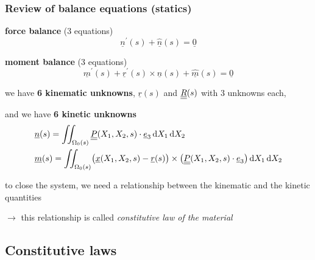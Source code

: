 \begin{frame}
  \frametitle{Review of balance equations (statics)}
  
  \textbf{force balance} (3 equations)
  \begin{displaymath}
    \underline{n}^{\prime}(s) + \underline{\hat{n}}(s) = \underline{0}
  \end{displaymath}
  
  \textbf{moment balance} (3 equations)
  \begin{displaymath}
    \underline{m}^{\prime}(s) + \underline{r}^{\prime}(s) \times \underline{n}(s) + \underline{\hat{m}}(s) = \underline{0}
  \end{displaymath}
  
  \vspace{1em}
  we have \textbf{6 kinematic unknowns}, $\underline{r}(s)$ and $\underline{\underline{R}}(s)$ with 3 unknowns each,
  
  \vspace{0.3em}
  and we have \textbf{6 kinetic unknowns}
  \begin{displaymath}
    \begin{alignedat}{1}
      &\underline{n}(s) = \iint_{\Omega_0(s)} \doubleunderline{P}(X_1, X_2, s) \cdot \underline{e}_3 \dif X_1 \dif X_2 \\
      &\underline{m}(s) = \iint_{\Omega_0(s)} \bigl( \underline{x}(X_1,X_2,s) - \underline{r}(s) \bigr) \times \bigl( \doubleunderline{P}(X_1,X_2,s) \cdot \underline{e}_3 \bigr) \dif X_1 \dif X_2
    \end{alignedat}
  \end{displaymath}
  
  \vspace{0.3em}
  to close the system, we need a relationship between the kinematic and the kinetic quantities
  
  \vspace{0.2em}
  $\rightarrow$ this relationship is called \textit{constitutive law of the material}
\end{frame}


\subsection{Constitutive laws}


